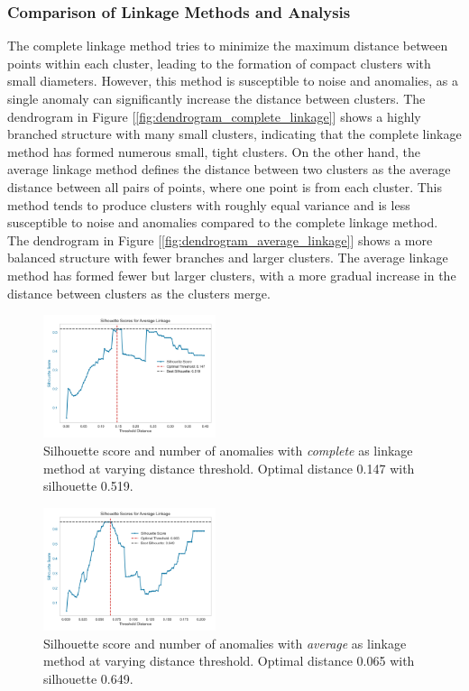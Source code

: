 \documentclass[a4paper]{article}
\begin{document}
\subsubsection{Comparison of Linkage Methods and Analysis}
The complete linkage method tries to minimize the maximum distance between points within each cluster, leading to the formation of compact clusters with small diameters. However, this method is susceptible to noise and anomalies, as a single anomaly can significantly increase the distance between clusters. The dendrogram in Figure [\ref{fig:dendrogram_complete_linkage}] shows a highly branched structure with many small clusters, indicating that the complete linkage method has formed numerous small, tight clusters.
On the other hand, the average linkage method defines the distance between two clusters as the average distance between all pairs of points, where one point is from each cluster. This method tends to produce clusters with roughly equal variance and is less susceptible to noise and anomalies compared to the complete linkage method. The dendrogram in Figure [\ref{fig:dendrogram_average_linkage}] shows a more balanced structure with fewer branches and larger clusters. The average linkage method has formed fewer but larger clusters, with a more gradual increase in the distance between clusters as the clusters merge.

\begin{figure}
    \centering
    \includegraphics[width=0.45\textwidth]{images/silhouette_score_complete_linkage.png}
    \caption{Silhouette score and number of anomalies with \textit{complete} as linkage method at varying distance threshold. Optimal distance 0.147 with silhouette 0.519.}
    \label{fig:silhouette_score_complete_linkage}
\end{figure}

\begin{figure}
    \centering
    \includegraphics[width=0.45\textwidth]{images/silhouette_score_average_linkage.png}
    \caption{Silhouette score and number of anomalies with \textit{average} as linkage method at varying distance threshold. Optimal distance 0.065 with silhouette 0.649.}
    \label{fig:silhouette_score_average_linkage}
\end{figure}
\end{document}
